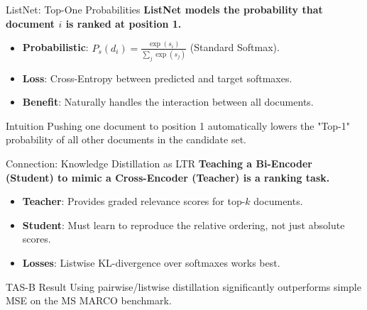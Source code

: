\documentclass[aspectratio=169]{beamer}
\newif\ifanimated
\newcommand{\cpause}{\ifanimated\pause\fi}
\begin{document}
\begin{frame}{ListNet: Top-One Probabilities}
\textbf{ListNet models the probability that document $i$ is ranked at position 1.}

\vspace{0.8em}
\begin{itemize}
    \item \textbf{Probabilistic}: $P_s(d_i) = \frac{\exp(s_i)}{\sum_j \exp(s_j)}$ (Standard Softmax).
    \item \textbf{Loss}: Cross-Entropy between predicted and target softmaxes.
    \item \textbf{Benefit}: Naturally handles the interaction between all documents.
\end{itemize}\cpause

\vspace{1em}
\cpause
\begin{exampleblock}{Intuition}
Pushing one document to position 1 automatically lowers the "Top-1" probability of all other documents in the candidate set.
\end{exampleblock}
\end{frame}

\begin{frame}{Connection: Knowledge Distillation as LTR}
\textbf{Teaching a Bi-Encoder (Student) to mimic a Cross-Encoder (Teacher) is a ranking task.}

\vspace{0.8em}
\begin{itemize}
    \item \textbf{Teacher}: Provides graded relevance scores for top-$k$ documents.
    \item \textbf{Student}: Must learn to reproduce the relative ordering, not just absolute scores.
    \item \textbf{Losses}: Listwise KL-divergence over softmaxes works best.
\end{itemize}\cpause

\vspace{1em}
\cpause
\begin{exampleblock}{TAS-B Result}
Using pairwise/listwise distillation significantly outperforms simple MSE on the MS MARCO benchmark.
\end{exampleblock}
\end{frame}
\end{document}
